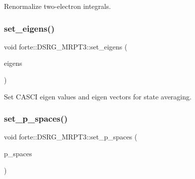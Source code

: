 Renormalize two-\/electron integrals. 

\mbox{\label{classforte_1_1_d_s_r_g___m_r_p_t3_a20ec1fcadc9b1e3cb8d21df9a86fa055}} 
\subsubsection{\texorpdfstring{set\+\_\+eigens()}{set\_eigens()}}
{\footnotesize\ttfamily void forte\+::\+D\+S\+R\+G\+\_\+\+M\+R\+P\+T3\+::set\+\_\+eigens (\begin{DoxyParamCaption}\item[{std\+::vector$<$ std\+::vector$<$ std\+::pair$<$ psi\+::\+Shared\+Vector, double $>$$>$$>$}]{eigens }\end{DoxyParamCaption})\hspace{0.3cm}{\ttfamily [inline]}}



Set C\+A\+S\+CI eigen values and eigen vectors for state averaging. 

\mbox{\label{classforte_1_1_d_s_r_g___m_r_p_t3_af5b78a8ae153c66e5733d0749972185b}} 
\subsubsection{\texorpdfstring{set\+\_\+p\+\_\+spaces()}{set\_p\_spaces()}}
{\footnotesize\ttfamily void forte\+::\+D\+S\+R\+G\+\_\+\+M\+R\+P\+T3\+::set\+\_\+p\+\_\+spaces (\begin{DoxyParamCaption}\item[{std\+::vector$<$ std\+::vector$<$ \mbox{\hyperlink{namespaceforte_a2076c63fd7b8732004d9e1442ce527c1}{forte\+::\+Determinant}} $>$$>$}]{p\+\_\+spaces }\end{DoxyParamCaption})\hspace{0.3cm}{\ttfamily [inline]}}



